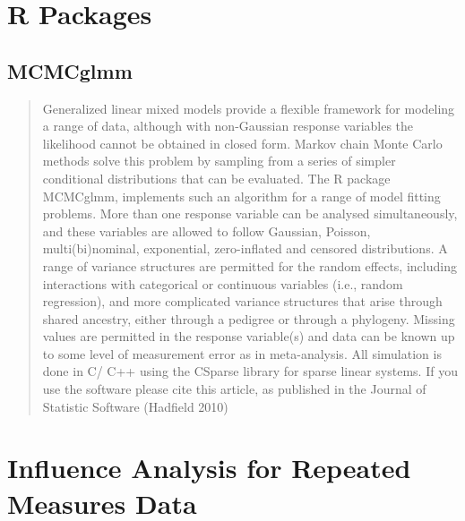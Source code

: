 \documentclass[a4paper,12pt]{article}
\begin{document}
 	\tableofcontents
 \section{R Packages}
 
 \subsection{MCMCglmm}
 \begin{quote}
 	Generalized linear mixed models provide a flexible framework for modeling a range of
 	data, although with non-Gaussian response variables the likelihood cannot be obtained in
 	closed form. Markov chain Monte Carlo methods solve this problem by sampling from a
 	series of simpler conditional distributions that can be evaluated. The R package MCMCglmm,
 	implements such an algorithm for a range of model fitting problems. More than
 	one response variable can be analysed simultaneously, and these variables are allowed to
 	follow Gaussian, Poisson, multi(bi)nominal, exponential, zero-inflated and censored distributions.
 	A range of variance structures are permitted for the random effects, including
 	interactions with categorical or continuous variables (i.e., random regression), and more
 	complicated variance structures that arise through shared ancestry, either through a pedigree
 	or through a phylogeny. Missing values are permitted in the response variable(s) and
 	data can be known up to some level of measurement error as in meta-analysis. All simulation
 	is done in C/ C++ using the CSparse library for sparse linear systems. If you
 	use the software please cite this article, as published in the Journal of Statistic Software
 	(Hadfield 2010)
 \end{quote}
\newpage
 \section{Influence Analysis for Repeated Measures Data}


\end{document}
